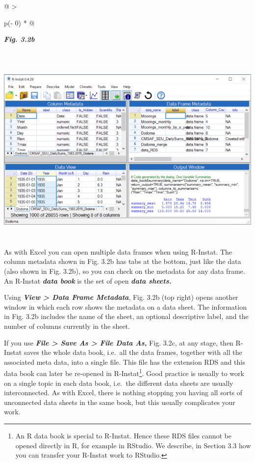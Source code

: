 \documentclass[
  letterpaper,
  DIV=11,
  numbers=noendperiod]{scrreprt}
\begin{document}
\begin{longtable}[]{@{}
  >{\raggedright\arraybackslash}p{(\columnwidth - 0\tabcolsep) * }@{}}
\toprule\noalign{}
\begin{minipage}[b]{\linewidth}\raggedright
\textbf{\emph{Fig. 3.2b}}
\end{minipage} \\
\midrule\noalign{}
\endhead
\bottomrule\noalign{}
\endlastfoot
\includegraphics[width=6.19318in,height=3.7589in]{figures/Fig3.2b.png} \\
\end{longtable}

As with Excel you can open multiple data frames when using R-Instat. The
column metadata shown in Fig. 3.2b has tabs at the bottom, just like the
data (also shown in Fig. 3.2b), so you can check on the metadata for any
data frame. An R-Instat \textbf{\emph{data book}} is the set of open
\textbf{\emph{data sheets.}}

Using \textbf{\emph{View \textgreater{} Data Frame Metadata}}, Fig. 3.2b
(top right) opens another window in which each row shows the metadata on
a data sheet. The information in Fig. 3.2b includes the name of the
sheet, an optional descriptive label, and the number of columns
currently in the sheet.

If you use \textbf{\emph{File \textgreater{} Save As \textgreater{} File
Data As,}} Fig. 3.2c, at any stage, then R-Instat saves the whole data
book, i.e.~all the data frames, together with all the associated meta
data, into a single file. This file has the extension RDS and this data
book can later be re-opened in R-Instat\footnote{An R data book is
  special to R-Instat. Hence these RDS files cannot be opened directly
  in R, for example in RStudio. We describe, in Section 3.3 how you can
  transfer your R-Instat work to RStudio.}. Good practice is usually to
work on a single topic in each data book, i.e.~the different data sheets
are usually interconnected. As with Excel, there is nothing stopping you
having all sorts of unconnected data sheets in the same book, but this
usually complicates your work.
\end{document}
